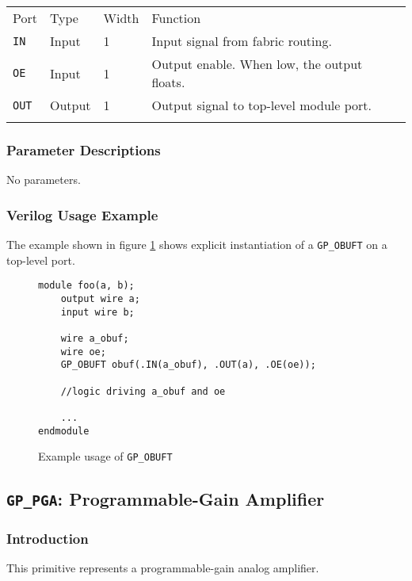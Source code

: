\documentclass[11pt]{article}
\newcommand{\tokenstyle}[1]{\texttt{#1}}
\newcommand{\whenstyle}[1]{{\fontseries{sb}\selectfont#1}}
\newcommand{\thinhline}{\Xhline{1\arrayrulewidth}}
\newcommand{\thickhline}{\Xhline{2.5\arrayrulewidth}}
\begin{document}
\begin{tabularx}{\textwidth}{lllX}
\thinhline
\whenstyle{Port} & \whenstyle{Type} & \whenstyle{Width} & \whenstyle{Function} \\
\thickhline
\tokenstyle{IN} & Input & 1 & Input signal from fabric routing. \\
\thinhline
\tokenstyle{OE} & Input & 1 & Output enable. When low, the output floats. \\
\thinhline
\tokenstyle{OUT} & Output & 1 & Output signal to top-level module port. \\
\thinhline
\end{tabularx}

\subsubsection{Parameter Descriptions}

No parameters.

\subsubsection{Verilog Usage Example}

The example shown in figure \ref{gp-obuft-example} shows explicit instantiation of a \tokenstyle{GP\_OBUFT} on a top-level port.

\begin{figure}[h]
\begin{lstlisting}
module foo(a, b);
	output wire a;
	input wire b;

	wire a_obuf;
	wire oe;
	GP_OBUFT obuf(.IN(a_obuf), .OUT(a), .OE(oe));

	//logic driving a_obuf and oe

	...
endmodule
\end{lstlisting}
\caption{Example usage of \tokenstyle{GP\_OBUFT}}
\label{gp-obuft-example}
\end{figure}


\pagebreak
\clearpage
\subsection{\tokenstyle{GP\_PGA}: Programmable-Gain Amplifier}

\subsubsection{Introduction}
This primitive represents a programmable-gain analog amplifier.
\end{document}
